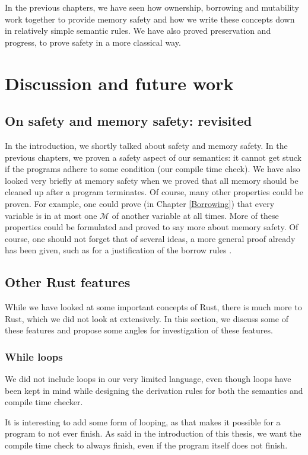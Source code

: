 In the previous chapters, we have seen how ownership, borrowing and mutability work together to provide memory safety and how we write these concepts down in relatively simple semantic rules. We have also proved preservation and progress, to prove safety in a more classical way. 

\section[discussion]{Discussion and future work}

\subsection{On safety and memory safety: revisited}
In the introduction, we shortly talked about safety and memory safety. In the previous chapters, we proven a safety aspect of our semantics: it cannot get stuck if the programs adhere to some condition (our compile time check). We have also looked very briefly at memory safety when we proved that all memory should be cleaned up after a program terminates. Of course, many other properties could be proven. For example, one could prove (in Chapter \ref{Borrowing}) that every variable is in at most one $\mathcal{M}$ of another variable at all times. More of these properties could be formulated and proved to say more about memory safety. Of course, one should not forget that of several ideas, a more general proof already has been given, such as for a justification of the borrow rules \citep{boyland2003checking}. 

\subsection{Other Rust features}
While we have looked at some important concepts of Rust, there is much more to Rust, which we did not look at extensively. In this section, we discuss some of these features and propose some angles for investigation of these features.

\subsubsection*{While loops}
We did not include loops in our very limited language, even though loops have been kept in mind while designing the derivation rules for both the semantics and compile time checker. 

It is interesting to add some form of looping, as that makes it possible for a program to not ever finish. As said in the introduction of this thesis, we want the compile time check to always finish, even if the program itself does not finish. 

